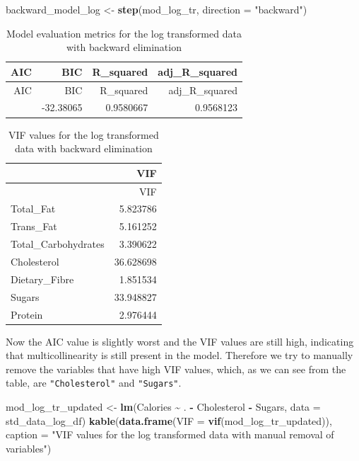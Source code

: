\documentclass[
]{article}
\newenvironment{Shaded}{\begin{snugshade}}{\end{snugshade}}
\newcommand{\AttributeTok}[1]{\textcolor[rgb]{0.13,0.29,0.53}{#1}}
\newcommand{\FunctionTok}[1]{\textcolor[rgb]{0.13,0.29,0.53}{\textbf{#1}}}
\newcommand{\NormalTok}[1]{#1}
\newcommand{\OtherTok}[1]{\textcolor[rgb]{0.56,0.35,0.01}{#1}}
\newcommand{\SpecialCharTok}[1]{\textcolor[rgb]{0.81,0.36,0.00}{\textbf{#1}}}
\newcommand{\StringTok}[1]{\textcolor[rgb]{0.31,0.60,0.02}{#1}}
\begin{document}
\begin{Shaded}
\begin{Highlighting}[]
\NormalTok{backward\_model\_log }\OtherTok{\textless{}{-}} \FunctionTok{step}\NormalTok{(mod\_log\_tr, }\AttributeTok{direction =} \StringTok{"backward"}\NormalTok{)}
\end{Highlighting}
\end{Shaded}

\begin{longtable}[]{@{}rrrr@{}}
\caption{Model evaluation metrics for the log transformed data with
backward elimination}\tabularnewline
\toprule\noalign{}
AIC & BIC & R\_squared & adj\_R\_squared \\
\midrule\noalign{}
\endfirsthead
\toprule\noalign{}
AIC & BIC & R\_squared & adj\_R\_squared \\
\midrule\noalign{}
\endhead
\bottomrule\noalign{}
\endlastfoot
-63.78109 & -32.38065 & 0.9580667 & 0.9568123 \\
\end{longtable}

\begin{longtable}[]{@{}lr@{}}
\caption{VIF values for the log transformed data with backward
elimination}\tabularnewline
\toprule\noalign{}
& VIF \\
\midrule\noalign{}
\endfirsthead
\toprule\noalign{}
& VIF \\
\midrule\noalign{}
\endhead
\bottomrule\noalign{}
\endlastfoot
Total\_Fat & 5.823786 \\
Trans\_Fat & 5.161252 \\
Total\_Carbohydrates & 3.390622 \\
Cholesterol & 36.628698 \\
Dietary\_Fibre & 1.851534 \\
Sugars & 33.948827 \\
Protein & 2.976444 \\
\end{longtable}

Now the AIC value is slightly worst and the VIF values are still high,
indicating that multicollinearity is still present in the model.
Therefore we try to manually remove the variables that have high VIF
values, which, as we can see from the table, are \texttt{"Cholesterol"}
and \texttt{"Sugars"}.

\begin{Shaded}
\begin{Highlighting}[]
\NormalTok{mod\_log\_tr\_updated }\OtherTok{\textless{}{-}} \FunctionTok{lm}\NormalTok{(Calories }\SpecialCharTok{\textasciitilde{}}\NormalTok{ . }\SpecialCharTok{{-}}\NormalTok{ Cholesterol }\SpecialCharTok{{-}}\NormalTok{ Sugars,}
                         \AttributeTok{data =}\NormalTok{ std\_data\_log\_df)}
\FunctionTok{kable}\NormalTok{(}\FunctionTok{data.frame}\NormalTok{(}\AttributeTok{VIF =} \FunctionTok{vif}\NormalTok{(mod\_log\_tr\_updated)),}
      \AttributeTok{caption =} \StringTok{"VIF values for the log transformed data with }
\StringTok{      manual removal of variables"}\NormalTok{)}
\end{Highlighting}
\end{Shaded}
\end{document}
